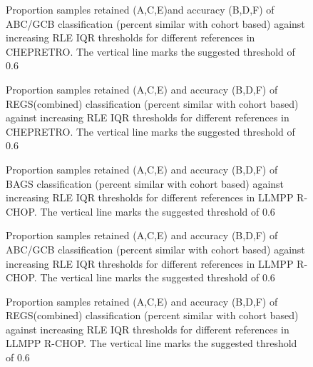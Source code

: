 \documentclass{article}
\begin{document}
\begin{figure}
	\begin{center}
	\end{center}
	\caption{Proportion samples retained (A,C,E)and accuracy (B,D,F) of ABC/GCB classification (percent similar with cohort based) against increasing RLE IQR thresholds for different references in CHEPRETRO. The vertical line marks the suggested threshold of 0.6}
	\label{fig:chep_rle_clas_abcgcb}
\end{figure}

\begin{figure}
	\begin{center}
	\end{center}
	\caption{Proportion samples retained (A,C,E) and accuracy (B,D,F) of REGS(combined) classification (percent similar with cohort based) against increasing RLE IQR thresholds for different references in CHEPRETRO. The vertical line marks the suggested threshold of 0.6}
	\label{fig:chep_rle_clas_regs}
\end{figure}

\begin{figure}
	\begin{center}
	\end{center}
	\caption{Proportion samples retained (A,C,E) and accuracy (B,D,F) of BAGS classification (percent similar with cohort based) against increasing RLE IQR thresholds for different references in LLMPP R-CHOP. The vertical line marks the suggested threshold of 0.6}
	\label{fig:RCHOP_rle_clas_bags}
\end{figure}

\begin{figure}
	\begin{center}
	\end{center}
	\caption{Proportion samples retained (A,C,E) and accuracy (B,D,F) of ABC/GCB classification (percent similar with cohort based) against increasing RLE IQR thresholds for different references in LLMPP R-CHOP. The vertical line marks the suggested threshold of 0.6}
	\label{fig:RCHOP_rle_clas_abcgcb}
\end{figure}

\begin{figure}
	\begin{center}
	\end{center}
	\caption{Proportion samples retained (A,C,E) and accuracy (B,D,F) of REGS(combined) classification (percent similar with cohort based) against increasing RLE IQR thresholds for different references in LLMPP R-CHOP. The vertical line marks the suggested threshold of 0.6}
	\label{fig:RCHOP_rle_clas_regs}
\end{figure}

\clearpage

\end{document}
